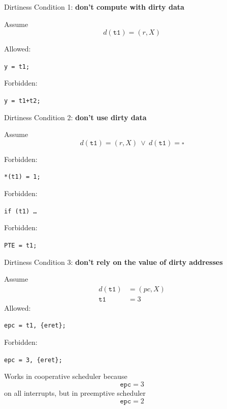 \documentclass{beamer}
\begin{document}
\begin{frame} 
Dirtiness Condition 1: \textbf{don't compute with dirty data}

Assume
\[ d(\texttt{t1}) = (r,X) \]

Allowed:
\begin{center}\texttt{y = t1;}\end{center} 

Forbidden:
\begin{center}\texttt{y = t1+t2;}\end{center} 
\end{frame}

\begin{frame} 
Dirtiness Condition 2: \textbf{don't use dirty data}

Assume \[ d(\texttt{t1}) = (r,X) \ \lor \ d(\texttt{t1}) = \square \]

Forbidden:
\begin{center}\texttt{*(t1) = 1;}\end{center} 

Forbidden:
\begin{center}\texttt{if (t1) \ldots}\end{center} 

Forbidden:
\begin{center}\texttt{PTE = t1;}\end{center} 
\end{frame}

\begin{frame} 
Dirtiness Condition 3: \textbf{don't rely on the value of dirty addresses}

Assume 
\begin{align*} d(\texttt{t1}) &= (pc,X) 
\\
	\texttt{t1} &= 3
\end{align*}
Allowed:
\begin{center}\texttt{epc = t1, \{eret\};}\end{center} 

Forbidden:
\begin{center}\texttt{epc = 3, \{eret\};}\end{center} 
\end{frame} 

\begin{frame} 

Works in cooperative scheduler because 
\[ \texttt{epc} = 3 \]
on all interrupts, but in preemptive scheduler
\[ \texttt{epc} = 2 \]
\end{frame}
\end{document}

